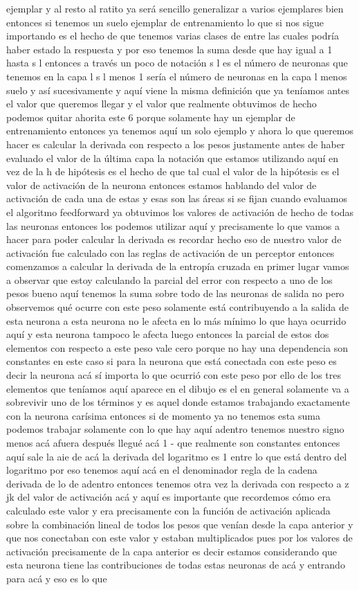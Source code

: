 ejemplar y al resto al ratito ya será sencillo generalizar a varios ejemplares bien entonces si tenemos un suelo ejemplar de entrenamiento lo que si nos sigue importando es el hecho de que tenemos varias clases de entre las cuales podría haber estado la respuesta y por eso tenemos la suma desde que hay igual a 1 hasta s l entonces a través un poco de notación s l es el número de neuronas que tenemos en la capa l s l menos 1 sería el número de neuronas en la capa l menos suelo y así sucesivamente y aquí viene la misma definición que ya teníamos antes el valor que queremos llegar y el valor que realmente obtuvimos de hecho podemos quitar ahorita este 6 porque solamente hay un ejemplar de entrenamiento entonces ya tenemos aquí un solo ejemplo y ahora lo que queremos hacer es calcular la derivada con respecto a los pesos justamente antes de haber evaluado el valor de la última capa la notación que estamos utilizando aquí en vez de la h de hipótesis es el hecho de que tal cual el valor de la hipótesis es el valor de activación de la neurona entonces estamos hablando del valor de activación de cada una de estas y esas son las áreas si se fijan cuando evaluamos el algoritmo feedforward ya obtuvimos los valores de activación de hecho de todas las neuronas entonces los podemos utilizar aquí y precisamente lo que vamos a hacer para poder calcular la derivada es recordar hecho eso de nuestro valor de activación fue calculado con las reglas de activación de un perceptor entonces comenzamos a calcular la derivada de la entropía cruzada en primer lugar vamos a observar que estoy calculando la parcial del error con respecto a uno de los pesos bueno aquí tenemos la suma sobre todo de las neuronas de salida no pero observemos qué ocurre con este peso solamente está contribuyendo a la salida de esta neurona a esta neurona no le afecta en lo más mínimo lo que haya ocurrido aquí y esta neurona tampoco le afecta luego entonces la parcial de estos dos elementos con respecto a este peso vale cero porque no hay una dependencia son constantes en este caso si para la neurona que está conectada con este peso es decir la neurona acá sí importa lo que ocurrió con este peso por ello de los tres elementos que teníamos aquí aparece en el dibujo es el en general solamente va a sobrevivir uno de los términos y es aquel donde estamos trabajando exactamente con la neurona carísima entonces si de momento ya no tenemos esta suma podemos trabajar solamente con lo que hay aquí adentro tenemos nuestro signo menos acá afuera después llegué acá 1 - que realmente son constantes entonces aquí sale la aie de acá la derivada del logaritmo es 1 entre lo que está dentro del logaritmo por eso tenemos aquí acá en el denominador regla de la cadena derivada de lo de adentro entonces tenemos otra vez la derivada con respecto a z jk del valor de activación acá y aquí es importante que recordemos cómo era calculado este valor y era precisamente con la función de activación aplicada sobre la combinación lineal de todos los pesos que venían desde la capa anterior y que nos conectaban con este valor y estaban multiplicados pues por los valores de activación precisamente de la capa anterior es decir estamos considerando que esta neurona tiene las contribuciones de todas estas neuronas de acá y entrando para acá y eso es lo que 